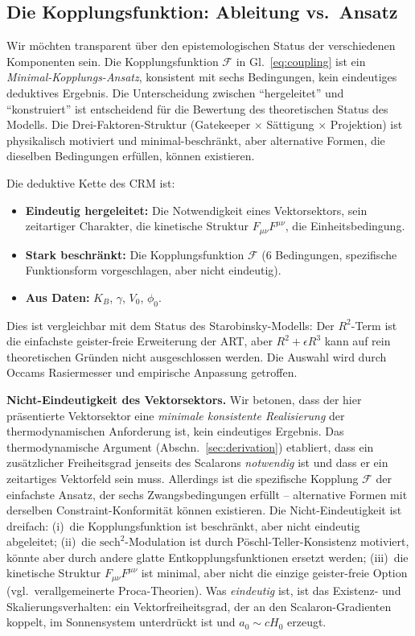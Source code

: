 \documentclass[aps,prd,twocolumn,superscriptaddress,nofootinbib]{revtex4-2}
\begin{document}
\subsection{Die Kopplungsfunktion: Ableitung vs.\ Ansatz}

Wir m\"ochten transparent \"uber den epistemologischen Status der verschiedenen Komponenten sein. Die Kopplungsfunktion $\mathcal{F}$ in Gl.~\eqref{eq:coupling} ist ein \textit{Minimal-Kopplungs-Ansatz}, konsistent mit sechs Bedingungen, kein eindeutiges deduktives Ergebnis. Die Unterscheidung zwischen ``hergeleitet'' und ``konstruiert'' ist entscheidend f\"ur die Bewertung des theoretischen Status des Modells. Die Drei-Faktoren-Struktur (Gatekeeper $\times$ S\"attigung $\times$ Projektion) ist physikalisch motiviert und minimal-beschr\"ankt, aber alternative Formen, die dieselben Bedingungen erf\"ullen, k\"onnen existieren.

Die deduktive Kette des CRM ist:
\begin{itemize}
\item \textbf{Eindeutig hergeleitet:} Die Notwendigkeit eines Vektorsektors, sein zeitartiger Charakter, die kinetische Struktur $F_{\mu\nu}F^{\mu\nu}$, die Einheitsbedingung.
\item \textbf{Stark beschr\"ankt:} Die Kopplungsfunktion $\mathcal{F}$ (6 Bedingungen, spezifische Funktionsform vorgeschlagen, aber nicht eindeutig).
\item \textbf{Aus Daten:} $K_B$, $\gamma$, $V_0$, $\phi_0$.
\end{itemize}

Dies ist vergleichbar mit dem Status des Starobinsky-Modells: Der $R^2$-Term ist die einfachste geister-freie Erweiterung der ART, aber $R^2 + \epsilon R^3$ kann auf rein theoretischen Gr\"unden nicht ausgeschlossen werden. Die Auswahl wird durch Occams Rasiermesser und empirische Anpassung getroffen.

\textbf{Nicht-Eindeutigkeit des Vektorsektors.} Wir betonen, dass der hier pr\"asentierte Vektorsektor eine \emph{minimale konsistente Realisierung} der thermodynamischen Anforderung ist, kein eindeutiges Ergebnis. Das thermodynamische Argument (Abschn.~\ref{sec:derivation}) etabliert, dass ein zus\"atzlicher Freiheitsgrad jenseits des Scalarons \emph{notwendig} ist und dass er ein zeitartiges Vektorfeld sein muss. Allerdings ist die spezifische Kopplung $\mathcal{F}$ der einfachste Ansatz, der sechs Zwangsbedingungen erf\"ullt -- alternative Formen mit derselben Constraint-Konformit\"at k\"onnen existieren. Die Nicht-Eindeutigkeit ist dreifach: (i)~die Kopplungsfunktion ist beschr\"ankt, aber nicht eindeutig abgeleitet; (ii)~die $\mathrm{sech}^2$-Modulation ist durch P\"oschl-Teller-Konsistenz motiviert, k\"onnte aber durch andere glatte Entkopplungsfunktionen ersetzt werden; (iii)~die kinetische Struktur $F_{\mu\nu}F^{\mu\nu}$ ist minimal, aber nicht die einzige geister-freie Option (vgl.\ verallgemeinerte Proca-Theorien). Was \emph{eindeutig} ist, ist das Existenz- und Skalierungsverhalten: ein Vektorfreiheitsgrad, der an den Scalaron-Gradienten koppelt, im Sonnensystem unterdr\"uckt ist und $a_0 \sim cH_0$ erzeugt.
\end{document}

